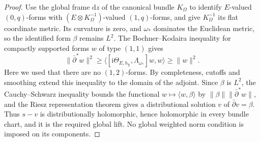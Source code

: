 \begin{proof}
Use the global frame $\mathrm{d}z$ of the canonical bundle $K_\Omega$ to identify $E$-valued $(0,q)$-forms with $(E\otimes K_\Omega^{-1})$-valued $(1,q)$-forms, and give $K_\Omega^{-1}$ its flat coordinate metric. Its curvature is zero, and $\omega_*$ dominates the Euclidean metric, so the identified form $\beta$ remains $L^2$. The Bochner--Kodaira inequality for compactly supported forms $w$ of type $(1,1)$ gives
\[
 \|\bar\partial^*w\|^2\geq
       \langle[\mathrm i\Theta_{E,h_\chi},\Lambda_{\omega_*}]w,w\rangle
       \geq\|w\|^2.
\]
Here we used that there are no $(1,2)$-forms. By completeness, cutoffs and smoothing extend this inequality to the domain of the adjoint. Since $\beta$ is $L^2$, the Cauchy--Schwarz inequality bounds the functional $w\mapsto\langle w,\beta\rangle$ by $\|\beta\|\|\bar\partial^*w\|$, and the Riesz representation theorem gives a distributional solution $v$ of $\bar\partial v=\beta$. Thus $s-v$ is distributionally holomorphic, hence holomorphic in every bundle chart, and it is the required global lift. No global weighted norm condition is imposed on its components.
\end{proof}

